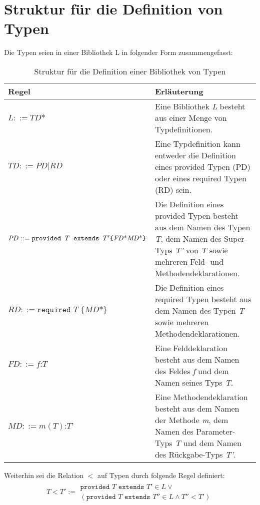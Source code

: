 \documentclass[a4paper,12pt]{article}
\begin{document}
\section{Struktur für die Definition von Typen}
Die Typen seien in einer Bibliothek $\text{L}$ in folgender Form zusammengefasst:
\begin{table}[H]
\centering
\begin{tabular}{|p{5.5cm}|p{8.5cm}|}
\hline
\hline
\centering\textbf{Regel} & \textbf{Erläuterung} \\
\hline
\hline
$\mathit{L} ::= \mathit{TD}\text{*}$ & Eine Bibliothek \emph{L} besteht aus einer Menge von Typdefinitionen.\\
\hline
$\mathit{TD} ::= \mathit{PD} | \mathit{RD}$ & Eine Typdefinition kann entweder die Definition eines provided Typen (PD) oder eines required Typen (RD) sein.\\
\hline
$\mathit{PD} ::= \newline\texttt{provided }T \texttt{ extends } T' \newline  \texttt{\{} \mathit{FD}\text{*} \mathit{MD}\text{*}\texttt{\}}$& Die Definition eines provided Typen besteht aus dem Namen des Typen \emph{T}, dem Namen des Super-Typs \emph{T'} von \emph{T} sowie mehreren Feld- und Methodendeklarationen.\\
\hline
$\mathit{RD} ::= \texttt{required } T \texttt{ \{}\mathit{MD}\text{*}\texttt{\}}$ & Die Definition eines required Typen besteht aus dem Namen des Typen \emph{T} sowie mehreren Methodendeklarationen.\\
\hline
$\mathit{FD} ::= \mathit{f} \texttt{:} T$ & Eine Felddeklaration besteht aus dem Namen des Feldes \emph{f} und dem Namen seines Typs \emph{T}.\\
\hline
$\mathit{MD} ::= \mathit{m(T)}\texttt{:}\mathit{T}$' & Eine Methodendeklaration besteht aus dem Namen der Methode \emph{m}, dem Namen des Parameter-Typs \emph{T} und dem Namen des Rückgabe-Typs \emph{T'}.\\
\hline
\hline
\end{tabular}
\caption{Struktur für die Definition einer Bibliothek von Typen}
 \label{tab:eIShort}
\end{table}
\noindent
Weiterhin sei die Relation $<$ auf Typen durch folgende Regel definiert:
\begin{gather*}
T < T' := \begin{array}{l}
	\texttt{provided }T \texttt{ extends } T' \in L \vee\\
	(\texttt{provided } T \texttt{ extends } T'' \in L \wedge T'' < T')
		\end{array}
\end{gather*}
\end{document}
